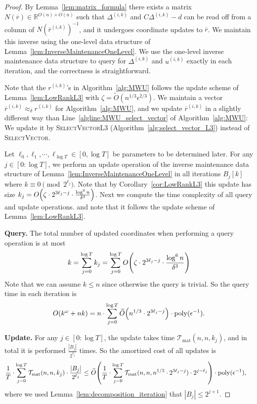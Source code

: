 \documentclass[11pt]{article}
\newcommand\rea{\mathbb{R}}
\newcommand{\Tmat}{\mathcal{T}_{\mathrm{mat}}}
\let\originalleft\left
\let\originalright\right
\renewcommand{\left}{\mathopen{}\mathclose\bgroup\originalleft}
\renewcommand{\right}{\aftergroup\egroup\originalright}
\newcommand\dd{\boldsymbol{\mathit{d}}}
\newcommand\rr{\boldsymbol{\mathit{r}}}
\newcommand\uu{\boldsymbol{\mathit{u}}}
\newcommand\rrbar{\overline{\boldsymbol{\mathit{r}}}}
\newcommand\CC{\boldsymbol{\mathit{C}}}
\newcommand\NN{\boldsymbol{\mathit{N}}}
\newcommand{\wt}{\widetilde}
\DeclareMathOperator*{\poly}{{\mathrm{poly}}}
\begin{document}
\begin{proof}
By Lemma~\ref{lem:matrix_formula} there exists a matrix $\NN(\rrbar) \in \rea^{O(n) \times O(n)}$ such that $\Delta^{(i,k)}$ and $\CC \Delta^{(i,k)} - \dd$ can be read off from a column of $\NN(\rrbar^{(i,k)})^{-1}$, and it undergoes coordinate updates to $\rrbar$. We maintain this inverse using the one-level data structure of Lemma~\ref{lem:InverseMaintenanceOneLevel}. 
We use the one-level inverse maintenance data structure to query for $\Delta^{(i,k)}$ and $\uu^{(i,k)}$ exactly in each iteration, and the correctness is straightforward.


Note that the $\rr^{(i,k)}$'s in Algorithm~\ref{alg:MWU} follows the update scheme of Lemma~\ref{lem:LowRankL3} with $\zeta = \wt{O}(n^{1/3} \epsilon^{2/3})$. We maintain a vector $\rrbar^{(i,k)} \approx_{\delta} \rr^{(i,k)}$ for Algorithm~\ref{alg:MWU}, and we update $\rrbar^{(i,k)}$ in a slightly different way than Line~\ref{algline:MWU_select_vector} of Algorithm~\ref{alg:MWU}: We update it by \textsc{SelectVectorL3} (Algorithm~\ref{alg:select_vector_L3}) instead of \textsc{SelectVector}.

Let $\ell_0, \ell_1, \cdots, \ell_{\log T} \in [0,\log T]$ be parameters to be determined later. For any $j \in [0: \log T]$, we perform an update operation of the inverse maintenance data structure of Lemma~\ref{lem:InverseMaintenanceOneLevel} in all iterations $B_j[k]$ where $k \equiv 0 \pmod {2^{\ell_j}}$. Note that by Corollary~\ref{cor:LowRankL3} this update has size $k_j = O\left(\zeta \cdot 2^{3 \ell_j - j} \cdot \frac{\log^6 n}{\delta^3} \right)$. Next we compute the time complexity of all query and update operations.
 and note that it follows the update scheme of Lemma~\ref{lem:LowRankL3}. 




{\bf Query.} The total number of updated coordinates when performing a query operation is at most
\begin{align*}
k = \sum_{j=0}^{\log T} k_j = \sum_{j=0}^{\log T} O\left(\zeta \cdot 2^{3 \ell_j - j} \cdot \frac{\log^6 n}{\delta^3} \right)
\end{align*}
Note that we can assume $k \leq n$ since otherwise the query is trivial. So the query time in each iteration is
\begin{align*}
O(k^{\omega} + nk) = n \cdot \sum_{j=0}^{\log T} \wt{O}\left(n^{1/3} \cdot 2^{3 \ell_j - j} \right) \cdot \poly(\epsilon^{-1}).
\end{align*}

{\bf Update.} For any $j \in [0: \log T]$, the update takes time $\Tmat(n,n,k_j)$, and in total it is performed $\frac{|B_j|}{2^{\ell_j}}$ times. So the amortized cost of all updates is
\begin{align*}
\frac{1}{T} \cdot \sum_{j=0}^{\log T} \Tmat(n,n,k_j) \cdot \frac{|B_j|}{2^{\ell_j}} \leq &~ \wt{O}\left(\frac{1}{T} \cdot \sum_{j=0}^{\log T} \Tmat(n,n, n^{1/3} \cdot 2^{3 \ell_j - j}) \cdot 2^{j - \ell_j} \right)  \cdot \poly(\epsilon^{-1}), 
\end{align*}
where we used Lemma~\ref{lem:decomposition_iteration} that $|B_j| \leq 2^{j+1}$.


\end{proof}
\end{document}
